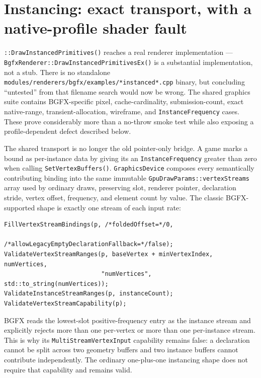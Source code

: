 \section{Instancing: exact transport, with a native-profile shader fault}
\label{sec:bgfx-instancing}

\allowbreak{}\texttt{::DrawInstancedPrimitives()} reaches a real
renderer implementation --- \texttt{BgfxRenderer::DrawInstancedPrimitivesEx()} is a
substantial implementation, not a stub. There is no standalone
\texttt{modules/renderers/bgfx/examples/*instanced*.cpp} binary, but concluding ``untested''
from that filename search would now be wrong. The shared graphics suite contains BGFX-specific
pixel, cache-cardinality, submission-count, exact native-range, transient-allocation, wireframe,
and \texttt{InstanceFrequency} cases. These prove considerably more than a no-throw smoke test
while also exposing a profile-dependent defect described below.

The shared transport is no longer the old pointer-only bridge. A game marks a bound
 as per-instance data by giving its
 an \texttt{InstanceFrequency} greater than zero when calling
\texttt{SetVertexBuffers()}. \texttt{GraphicsDevice} composes every semantically contributing
binding into the same immutable \texttt{GpuDrawParams::vertexStreams} array used by ordinary
draws, preserving slot, renderer pointer, declaration stride, vertex offset, frequency, and
element count by value. The classic BGFX-supported shape is exactly one stream of each input
rate:

\begin{lstlisting}
FillVertexStreamBindings(p, /*foldedOffset=*/0,
                         /*allowLegacyEmptyDeclarationFallback=*/false);
ValidateVertexStreamRanges(p, baseVertex + minVertexIndex, numVertices,
                           "numVertices", std::to_string(numVertices));
ValidateInstanceStreamRanges(p, instanceCount);
ValidateVertexStreamCapability(p);
\end{lstlisting}

BGFX reads the lowest-slot positive-frequency entry as the instance stream and explicitly
rejects more than one per-vertex or more than one per-instance stream. This is why its
\texttt{MultiStreamVertexInput} capability remains false: a declaration cannot be split across
two geometry buffers and two instance buffers cannot contribute independently. The ordinary
one-plus-one instancing shape does not require that capability and remains valid.

